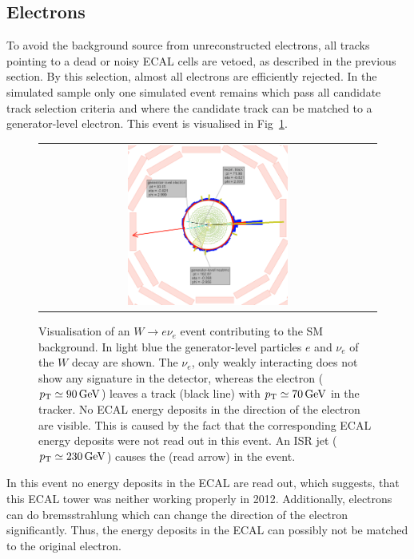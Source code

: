 \subsection*{Electrons}
To avoid the background source from unreconstructed electrons, all tracks pointing to a dead or noisy ECAL cells are vetoed, as described in the previous section.
By this selection, almost all electrons are efficiently rejected.
In the simulated \WJets sample only one simulated event remains which pass all candidate track selection criteria and where the candidate track can be matched to a generator-level electron.
This event is visualised in Fig~\ref{fig:LostElectron}. 
\begin{figure}[!tb]
  \centering 
  \begin{tabular}{c}
    \includegraphics[width=0.49\textwidth]{figures/analysis/Electron_lumi_279317_event_111637553.png}
  \end{tabular}
  \caption{Visualisation of an $W\rightarrow e\nu_e$ event contributing to the SM background. 
           In light blue the generator-level particles $e$ and $\nu_e$ of the $W$ decay are shown. 
           The $\nu_e$, only weakly interacting does not show any signature in the detector, whereas the electron ($p_{\text{T}}\simeq 90\,\text{Ge}\kern-0.06667em\text{V}$) leaves a track (black line) with \mbox{$p_{\text{T}}\simeq 70\,\text{Ge}\kern-0.06667em\text{V}$} in the tracker. 
           No ECAL energy deposits in the direction of the electron are visible. 
           This is caused by the fact that the corresponding ECAL energy deposits were not read out in this event.
           An ISR jet ($p_{\text{T}}\simeq 230\,\text{Ge}\kern-0.06667em\text{V}$) causes the \met (read arrow) in the event. }
  \label{fig:LostElectron}
\end{figure}
In this event no energy deposits in the ECAL are read out, which suggests, that this ECAL tower was neither working properly in 2012.
Additionally, electrons can do bremsstrahlung which can change the direction of the electron significantly.
Thus, the energy deposits in the ECAL can possibly not be matched to the original electron.


